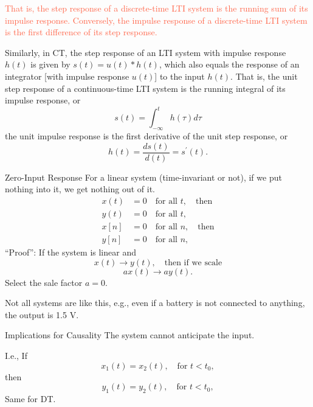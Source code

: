 \begin{frame}{}
    \textcolor{Tomato}{That is, the step response of a discrete-time LTI system is the running sum of its impulse response. Conversely, the impulse response of a discrete-time LTI system is the first difference of its step response.}\par
    Similarly, in CT, the step response of an LTI system with impulse response $h(t)$ is given by $s(t) = u(t) \ast h(t)$, which also equals the response of an integrator
    [with impulse response $u(t)$] to the input $h(t)$. That is, the unit step response of a continuous-time LTI system is the running integral of its impulse response, or
    {
        \begin{equation*}
            s(t) = \int_{-\infty}^{t}h(\tau)d\tau
        \end{equation*}
    the unit impulse response is the first derivative of the unit step response, or
        \begin{equation*}
            h(t) = \frac{ds(t)}{d(t)} = s^\prime(t).
        \end{equation*}
    }
\end{frame}




\begin{frame}{Zero-Input Response}
    For a linear system (time-invariant or not), if we put nothing into it, we get nothing out of it.
    \begin{align*}
        x(t)  &= 0 \quad \text{for all } t, \quad \text{then}\\
        y(t)  &= 0 \quad \text{for all } t,\\
        x[n]  &= 0 \quad \text{for all } n, \quad \text{then}\\
        y[n]  &= 0 \quad \text{for all } n,
    \end{align*}
    ``Proof'': If the system is linear and
    \begin{equation*}
        x(t) \rightarrow y(t), \quad \text{then if we scale}
    \end{equation*} \pause
    \begin{equation*}
        ax(t) \rightarrow ay(t).
    \end{equation*}
    Select the sale factor $a=0$.\par
    Not all systems are like this, e.g., even if a battery is not connected to anything, the output is 1.5 V.
\end{frame}

\begin{frame}{Implications for Causality}
    The system cannot anticipate the input.\par
    I.e.,
    If
    \begin{equation*}
        x_1(t) = x_2(t), \quad \text{for } t < t_0,
    \end{equation*}
    then
    \begin{equation*}
        y_1(t) = y_2(t), \quad \text{for } t < t_0,
    \end{equation*}
    Same for DT.
\end{frame}

